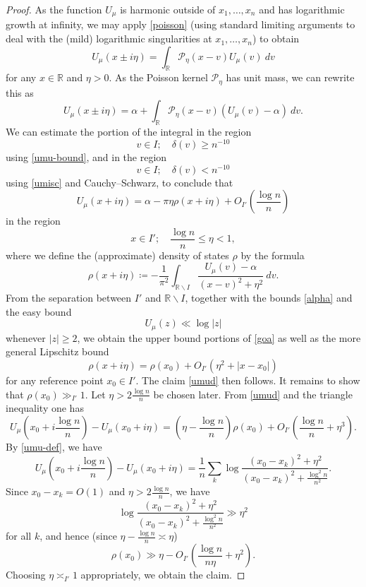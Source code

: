 \documentclass[12pt]{amsart}
\newcommand{\R}{\mathbb{R}}
\newcommand{\Poisson}{\mathcal{P}}
\begin{document}
\begin{proof}
As the function $U_\mu$ is harmonic outside of $x_1,\dots,x_n$ and has logarithmic growth at infinity, we may apply \eqref{poisson} (using standard limiting arguments to deal with the (mild) logarithmic singularities at $x_1,\dots,x_n$) to obtain
$$ U_\mu(x \pm i\eta) = \int_\R \Poisson_\eta(x-v) U_\mu(v)\ dv$$
for any $x \in \R$ and $\eta > 0$.  As the Poisson kernel $\Poisson_\eta$ has unit mass, we can rewrite this as
\begin{equation}\label{umo}
 U_\mu(x \pm i\eta) = \alpha + \int_\R \Poisson_\eta(x-v) (U_\mu(v) - \alpha)\ dv.
\end{equation}
We can estimate the portion of the integral in the region
$$ v \in I; \quad \delta(v) \geq n^{-10}$$
using \eqref{umu-bound}, and in the region
$$ v \in I; \quad \delta(v) < n^{-10}$$
using \eqref{umisc} and Cauchy--Schwarz, to conclude that
$$ U_\mu(x + i\eta) = \alpha - \pi \eta \rho( x + i \eta ) + O_{I'}\left( \frac{\log n}{n} \right)$$
in the region
$$ x \in I'; \quad \frac{\log n}{n} \leq \eta < 1,$$
where we define the (approximate) density of states $\rho$ by the formula
\begin{equation}\label{rho-def}
 \rho(x + i \eta) \coloneqq -\frac{1}{\pi^2} \int_{\R \backslash I} \frac{U_\mu(v) - \alpha}{(x-v)^2 + \eta^2} \ dv.
\end{equation}
From the separation between $I'$ and $\R \backslash I$, together with the bounds \eqref{alpha} and the easy bound
\begin{equation}\label{umu-large}
    U_\mu(z) \ll \log |z|
\end{equation}
whenever $|z| \geq 2$, we obtain the upper bound portions of \eqref{goa} as well as the more general Lipschitz bound
\begin{equation}\label{G-lip}
    \rho(x + i \eta) = \rho(x_0) + O_{I'}(\eta^2 + |x-x_0|)
\end{equation}
for any reference point $x_0 \in I'$.  The claim \eqref{umud} then follows. It remains to show that $\rho(x_0) \gg_{I'} 1$.  Let $\eta > 2\frac{\log n}{n}$ be chosen later.  From \eqref{umud} and the triangle inequality one has
$$ U_\mu\left(x_0 + i\frac{\log n}{n}\right) - U_\mu(x_0+i\eta) = \left(\eta - \frac{\log n}{n}\right) \rho(x_0) + O_{I'}\left( \frac{\log n}{n} + \eta^3 \right).$$
By \eqref{umu-def}, we have
$$ U_\mu\left(x_0 + i\frac{\log n}{n}\right) - U_\mu(x_0+i\eta) = \frac{1}{n} \sum_k \log \frac{(x_0-x_k)^2 + \eta^2}{(x_0-x_k)^2 + \frac{\log^2 n}{n^2}}.$$
Since $x_0 - x_k = O(1)$ and $\eta > 2 \frac{\log n}{n}$, we have
$$ \log \frac{(x_0-x_k)^2 + \eta^2}{(x_0-x_k)^2 + \frac{\log^2 n}{n^2}} \gg \eta^2$$
for all $k$, and hence (since $\eta - \frac{\log n}{n} \asymp \eta$)
$$ \rho(x_0) \gg \eta - O_{I'}\left( \frac{\log n}{n\eta} + \eta^2 \right).$$
Choosing $\eta \asymp_{I'} 1$ appropriately, we obtain the claim.


\end{proof}
\end{document}
